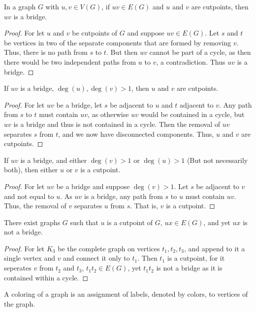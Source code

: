 \documentclass[crop=false,class=book]{standalone}
\begin{document}
\begin{theorem}
In a graph $G$ with $u,v\in V(G)$, if $uv\in E(G)$ and $u$ and $v$ are cutpoints, then $uv$ is a bridge.
\end{theorem}
\begin{proof}
For let $u$ and $v$ be cutpoints of $G$ and suppose $uv\in E(G)$. Let $s$ and $t$ be vertices in two of the separate components that are formed by removing $v$. Thus, there is no path from $s$ to $t$. But then $uv$ cannot be part of a cycle, as then there would be two independent paths from $u$ to $v$, a contradiction. Thus $uv$ is a bridge.
\end{proof}
\begin{theorem}
If $uv$ is a bridge, $\deg(u),\deg(v)>1$, then $u$ and $v$ are cutpoints.
\end{theorem}
\begin{proof}
For let $uv$ be a bridge, let $s$ be adjacent to $u$ and $t$ adjacent to $v$. Any path from $s$ to $t$ must contain $uv$, as otherwise $uv$ would be contained in a cycle, but $uv$ is a bridge and thus is not contained in a cycle. Then the removal of $uv$ separates $s$ from $t$, and we now have disconnected components. Thus, $u$ and $v$ are cutpoints.
\end{proof}
\begin{corollary}
If $uv$ is a bridge, and either $\deg(v)>1$ or $\deg(u)>1$ (But not necessarily both), then either $u$ or $v$ is a cutpoint.
\end{corollary}
\begin{proof}
For let $uv$ be a bridge and suppose $\deg(v)>1$. Let $s$ be adjacent to $v$ and not equal to $u$. As $uv$ is a bridge, any path from $s$ to $u$ must contain $uv$. Thus, the removal of $v$ separates $u$ from $s$. That is, $v$ is a cutpoint.
\end{proof}
\begin{corollary}
There exist graphs $G$ such that $u$ is a cutpoint of $G$, $ux \in E(G)$, and yet $ux$ is not a bridge.
\end{corollary}
\begin{proof}
For let $K_3$ be the complete graph on vertices $t_1,t_2,t_3$, and append to it a single vertex and $v$ and connect it only to $t_1$. Then $t_1$ is a cutpoint, for it seperates $v$ from $t_2$ and $t_3$, $t_1t_2\in E(G)$, yet $t_1 t_2$ is not a bridge as it is contained within a cycle.
\end{proof}
\begin{definition}
A coloring of a graph is an assignment of labels, denoted by colors, to vertices of the graph.
\end{definition}
\end{document}
